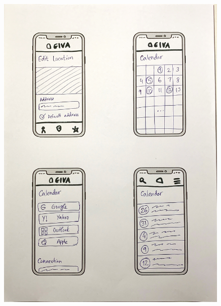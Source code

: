 \documentclass{article}
\begin{document}
\begin{figure}
\begin{minipage}{.5\textwidth}
		\includegraphics[width=1\linewidth]{drawing-phone-3.jpg}

\end{minipage}
\end{figure}
\end{document}
